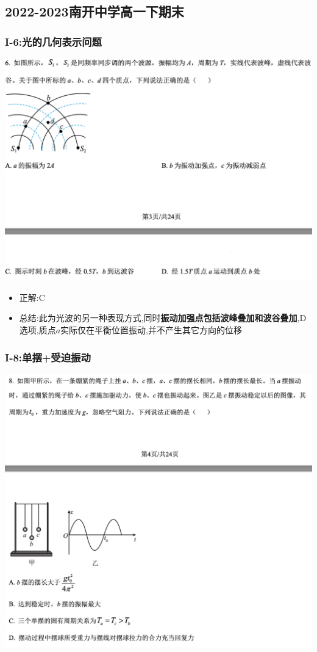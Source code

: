 \documentclass{article}
\begin{document}
\vspace{2em}

\subsection{2022-2023南开中学高一下期末}
\subsubsection{I-6:光的几何表示问题}
\includegraphics[width=50em,keepaspectratio]{./pictures/1.4-1.png}

\begin{itemize}
    \item 正解:\quad C
    \item 总结:\quad 此为光波的另一种表现方式,同时\textbf{振动加强点包括波峰叠加和波谷叠加},D选项,质点$a$实际仅在平衡位置振动,并不产生其它方向的位移
\end{itemize}

\vspace{2em}


\subsubsection{I-8:单摆+受迫振动}
\includegraphics[width=50em,keepaspectratio]{./pictures/1.4-2.png}
\end{document}
